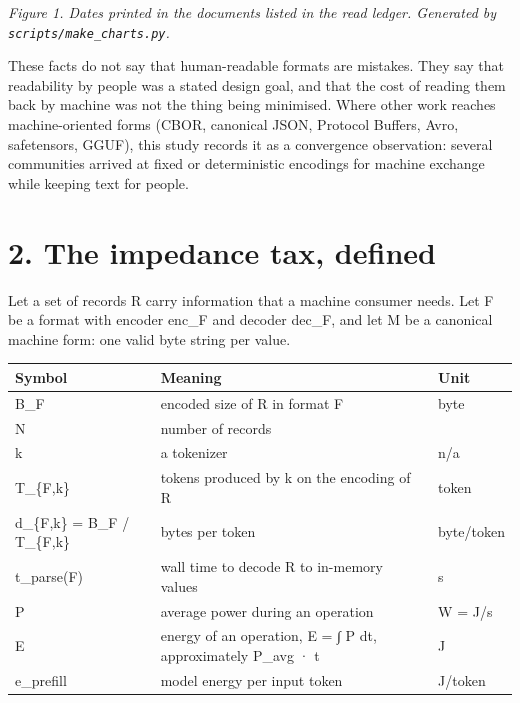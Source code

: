 \documentclass[10pt,letterpaper]{article}
\newcounter{none}
\begin{document}
\emph{Figure 1. Dates printed in the documents listed in the read
ledger. Generated by \texttt{scripts/\allowbreak{}make\_\allowbreak{}charts.\allowbreak{}py}.}

These facts do not say that human-readable formats are mistakes. They
say that readability by people was a stated design goal, and that the
cost of reading them back by machine was not the thing being minimised.
Where other work reaches machine-oriented forms (CBOR, canonical JSON,
Protocol Buffers, Avro, safetensors, GGUF), this study records it as a
convergence observation: several communities arrived at fixed or
deterministic encodings for machine exchange while keeping text for
people.

\section{2. The impedance tax, defined}\label{the-impedance-tax-defined}

Let a set of records R carry information that a machine consumer needs.
Let F be a format with encoder enc\_F and decoder dec\_F, and let M be a
canonical machine form: one valid byte string per value.

{\def\LTcaptype{none} %
{\footnotesize\setlength{\tabcolsep}{3.8pt}\renewcommand{\arraystretch}{1.15}
\begin{longtable}[]{@{}
  >{\raggedright\arraybackslash}p{}
  >{\raggedright\arraybackslash}p{}
  >{\raggedright\arraybackslash}p{}@{}}
\toprule\noalign{}
\begin{minipage}[b]{\linewidth}\raggedright
\textbf{Symbol}
\end{minipage} & \begin{minipage}[b]{\linewidth}\raggedright
\textbf{Meaning}
\end{minipage} & \begin{minipage}[b]{\linewidth}\raggedright
\textbf{Unit}
\end{minipage} \\
\midrule\noalign{}
\endhead
\bottomrule\noalign{}
\endlastfoot
B\_F & encoded size of R in format F & byte \\
N & number of records & 1 \\
k & a tokenizer & n/a \\
T\_\{F,k\} & tokens produced by k on the encoding of R & token \\
d\_\{F,k\} = B\_F / T\_\{F,k\} & bytes per token & byte/token \\
t\_parse(F) & wall time to decode R to in-memory values & s \\
P & average power during an operation & W = J/s \\
E & energy of an operation, E = ∫ P dt, approximately P\_avg · t & J \\
e\_prefill & model energy per input token & J/token \\
\end{longtable}
}
}
\end{document}
